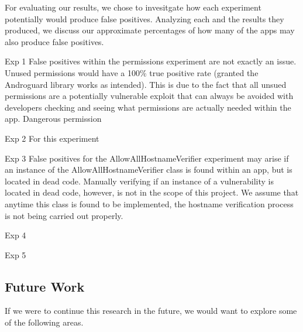 For evaluating our results, we chose to invesitgate how each experiment potentially would produce false positives. Analyzing each and the results they produced, 
we discuss our approximate percentages of how many of the apps may also produce false positives. 

Exp 1
False positives within the permissions experiment are not exactly an issue. Unused permissions would have a 100\% true positive rate (granted the Androguard library works as intended). 
This is due to the fact that all unsued permissions are a potentially vulnerable exploit that can always be avoided with developers checking and seeing what permissions are actually needed within the app. 
Dangerous permission 

Exp 2
For this experiment 

Exp 3
False positives for the AllowAllHostnameVerifier experiment may arise if an instance of the AllowAllHostnameVerifier 
class is found within an app, but is located in dead code. Manually verifying if an instance of a vulnerability is located 
in dead code, however, is not in the scope of this project. 
We assume that anytime this class is found to be implemented, the hostname verification process is not being carried out properly. 




Exp 4

Exp 5



\subsection{Future Work}
If we were to continue this research in the future, we would 
want to explore some of the following areas. 

